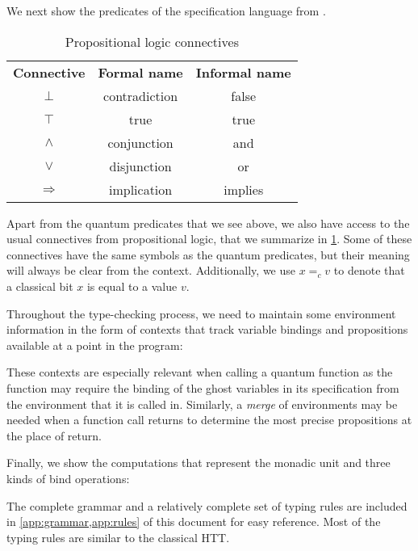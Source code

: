 We next show the predicates of the specification language from \textcite{unruh2019}.


\begin{table}
    \centering
    \begin{tabular}{ c c c }
        \textbf{Connective} & \textbf{Formal name} & \textbf{Informal name} \\
        $\bot$ & contradiction & false \\
        $\top$ & true & true\\
        $\wedge$ & conjunction & and\\
        $\vee$ & disjunction & or\\
        $\Rightarrow$ & implication & implies\\
    \end{tabular}
    \caption{Propositional logic connectives}
    \label{table:proplogic}
\end{table}

Apart from the quantum predicates that we see above, we also have access to the usual connectives from propositional logic, that we summarize in \cref{table:proplogic}. Some of these connectives have the same symbols as the quantum predicates, but their meaning will always be clear from the context. Additionally, we use $x =_c v$ to denote that a classical bit $x$ is equal to a value $v$.

Throughout the type-checking process, we need to maintain some environment information in the form of contexts that track variable bindings and propositions available at a point in the program:


These contexts are especially relevant when calling a quantum function as the function may require the binding of the ghost variables in its specification from the environment that it is called in. Similarly, a \textit{merge} of environments may be needed when a function call returns to determine the most precise propositions at the place of return.

Finally, we show the computations that represent the monadic unit and three kinds of bind operations:


The complete grammar and a relatively complete set of typing rules are included in \cref{app:grammar,app:rules} of this document for easy reference. Most of the typing rules are similar to the classical HTT.


